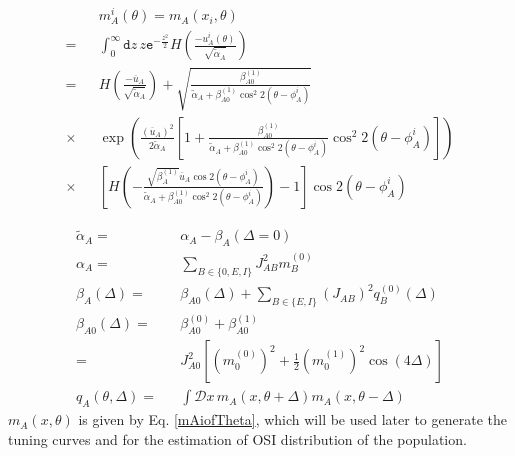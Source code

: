 \begin{eqnarray}
&&m_A^i(\theta) = m_A(x_i, \theta) \nonumber \\
=&& \int_{0}^{\infty} \mathtt{d} z\,  z \mathtt{e}^{-\frac{z^2}{2}} H\left( \frac{-u_A^i(\theta)}{\sqrt{\tilde{\alpha}_A }} \right)  \\
=&& H\left( \frac{-\overline{u}_A }{\sqrt{\tilde{\alpha}_A }}  \right) + \sqrt{\frac{\beta_{A0}^{(1)} }{  \tilde{\alpha}_A + \beta_{A0}^{(1)} \cos^2 2 (\theta - \phi_A^i) }} \nonumber \\ 
\times&&  \exp \left( \frac{\left( \overline{u}_A \right)^2  }{ 2 \tilde{\alpha}_A} \left[ 1 + \frac{\beta_{A0}^{(1)} }{ \tilde{\alpha}_A + \beta_{A0}^{(1)} \cos^2 2 (\theta - \phi_A^i)  } \cos^2 2 (\theta - \phi_A^i) \right] \right) \nonumber \\
\times&& \left[ H \left( - \frac{ \sqrt{\beta_A^{(1)} } \overline{u}_A \cos 2 (\theta - \phi_A^i)} {  \tilde{\alpha}_A + \beta_{A0}^{(1)} \cos^2 2 (\theta - \phi_A^i) } \right) - 1 \right] \cos2(\theta - \phi_A^i) \label{mAiofTheta} 
\end{eqnarray}

\begin{eqnarray}
\tilde{\alpha}_A =&& \alpha_A - \beta_A(\Delta = 0) \\ %
\alpha_{A} =&& \sum_{B \in \lbrace 0, E, I \rbrace} J_{AB}^2 m_B^{(0)} \\
\beta_{A}(\Delta) =&&  \beta_{A0} (\Delta) + \sum_{B \in \lbrace E, I \rbrace}  \left(J_{AB}\right)^2 q_B^{(0)}(\Delta) \\
\beta_{A0} (\Delta) =&& \beta_{A0}^{(0)} + \beta_{A0}^{(1)} \nonumber \\
=&& J^2_{A0} \left[ (m_0^{(0)})^2 + \frac{1}{2}(m_0^{(1)})^2  \cos(4\Delta) \right] \\
q_A (\theta, \Delta) =&& \int \mathcal{D} x \,  m_A(x, \theta + \Delta)  m_A(x, \theta - \Delta) 
\end{eqnarray}
$m_A(x, \theta)$ is given by Eq. \ref{mAiofTheta}, which will be used later to generate the tuning curves and for the estimation of OSI distribution of the population.
